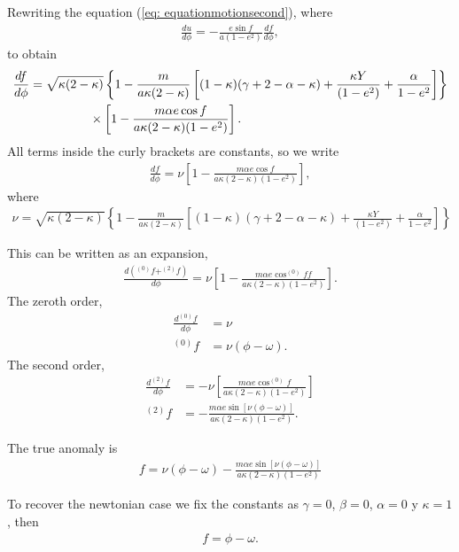 Rewriting the equation (\ref{eq: equationmotionsecond}), where
\begin{align*}
	\frac{du}{d\phi} = -\frac{e\sin f}{a(1-e^2)}\frac{df}{d\phi},
\end{align*}
to obtain
\begin{align}
\label{eq: dfdphi}
\begin{split}
	\frac{df}{d\phi} &=\sqrt{\kappa(2-\kappa)}\left\{1-\frac{m}{a\kappa(2-\kappa)}\left[(1-\kappa)(\gamma+2-\alpha-\kappa)+\frac{\kappa Y}{(1-e^2)}+\frac{\alpha}{1-e^2}\right]\right\}\\
	&\hspace{1.7cm}\times\left[1-\frac{m\alpha e \cos f}{a\kappa (2-\kappa)(1-e^2)}\right].
	\end{split}
\end{align}
All terms inside the curly brackets are constants, so we write
\begin{align}
	\frac{df}{d\phi} =\nu \left[1-\frac{m\alpha e \cos f}{a\kappa (2-\kappa)(1-e^2)}\right],
\end{align}
where 
\begin{align*}
	\nu = \sqrt{\kappa(2-\kappa)}\left\{1-\frac{m}{a\kappa(2-\kappa)}\left[(1-\kappa)(\gamma+2-\alpha-\kappa)+\frac{\kappa Y}{(1-e^2)}+\frac{\alpha}{1-e^2}\right]\right\}
\end{align*}

This can be written as an expansion,
\begin{align*}
	\frac{d(^{(0)}f+^{(2)}f)}{d\phi} =\nu \left[1-\frac{m\alpha e \cos ^{(0)}ff}{a\kappa (2-\kappa)(1-e^2)}\right].
\end{align*}
The zeroth order,
\begin{align*}
	\frac{d^{(0)}f}{d\phi} &=\nu \\
	^{(0)}f &= \nu(\phi-\omega).
\end{align*}
The second order,
\begin{align*}
	\frac{d^{(2)}f}{d\phi}& =-\nu \left[\frac{m\alpha e \cos ^{(0)}f}{a\kappa (2-\kappa)(1-e^2)}\right]  \\
	^{(2)}f & = -\frac{m\alpha e \sin [\nu(\phi-\omega)]}{a\kappa (2-\kappa)(1-e^2)}.
\end{align*}

The true anomaly is
\begin{align}
f =  \nu(\phi-\omega)-\frac{m\alpha e \sin [\nu(\phi-\omega)]}{a\kappa (2-\kappa)(1-e^2)}
\end{align}

To recover the newtonian case we fix the constants as $\gamma = 0$, $\beta = 0$, $\alpha = 0$ y $\kappa = 1$, then
\begin{align*}
f =  \phi-\omega.
\end{align*}

